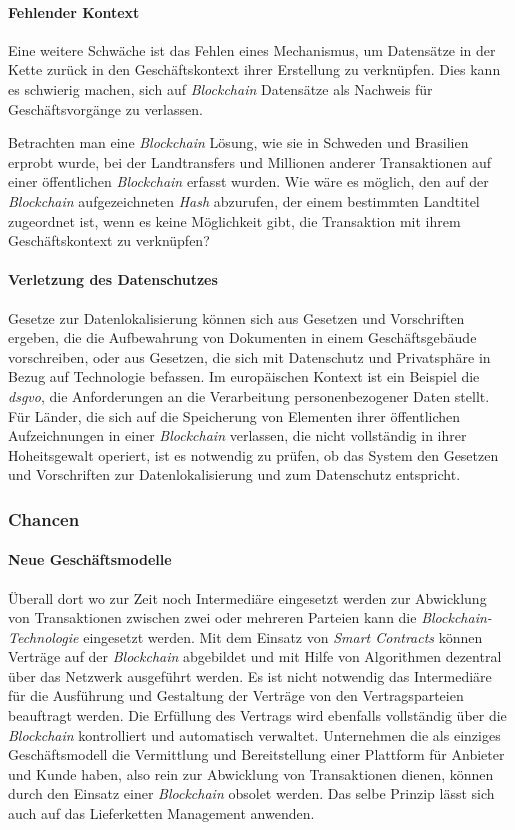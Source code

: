 \paragraph{Fehlender Kontext}
Eine weitere Schwäche ist das Fehlen eines Mechanismus, um Datensätze in der Kette zurück in den Geschäftskontext ihrer Erstellung zu verknüpfen. Dies kann es schwierig machen, sich auf \textit{Blockchain} Datensätze als Nachweis für Geschäftsvorgänge zu verlassen.

Betrachten man eine \textit{Blockchain} Lösung, wie sie in Schweden und Brasilien erprobt wurde, bei der Landtransfers und Millionen anderer Transaktionen auf einer öffentlichen \textit{Blockchain} erfasst wurden. Wie wäre es möglich, den auf der \textit{Blockchain} aufgezeichneten \textit{Hash} abzurufen, der einem bestimmten Landtitel zugeordnet ist, wenn es keine Möglichkeit gibt, die Transaktion mit ihrem Geschäftskontext zu verknüpfen?

\paragraph{Verletzung des Datenschutzes}
Gesetze zur Datenlokalisierung können sich aus Gesetzen und Vorschriften ergeben, die die Aufbewahrung von Dokumenten in einem Geschäftsgebäude vorschreiben, oder aus Gesetzen, die sich mit Datenschutz und Privatsphäre in Bezug auf Technologie befassen. Im europäischen Kontext ist ein Beispiel die \textit{\ac{dsgvo}}, die Anforderungen an die Verarbeitung personenbezogener Daten stellt. Für Länder, die sich auf die Speicherung von Elementen ihrer öffentlichen Aufzeichnungen in einer \textit{Blockchain} verlassen, die nicht vollständig in ihrer Hoheitsgewalt operiert, ist es notwendig zu prüfen, ob das System den Gesetzen und Vorschriften zur Datenlokalisierung und zum Datenschutz entspricht.

\subsubsection{Chancen}
\paragraph{Neue Geschäftsmodelle}
Überall dort wo zur Zeit noch Intermediäre eingesetzt werden zur Abwicklung von Transaktionen zwischen zwei oder mehreren Parteien kann die \textit{Blockchain-Technologie} eingesetzt werden. Mit dem Einsatz von \textit{Smart Contracts} können Verträge auf der \textit{Blockchain} abgebildet und mit Hilfe von Algorithmen dezentral über das Netzwerk ausgeführt werden. Es ist nicht notwendig das Intermediäre für die Ausführung und Gestaltung der Verträge von den Vertragsparteien beauftragt werden. Die Erfüllung des Vertrags wird ebenfalls vollständig über die \textit{Blockchain} kontrolliert und automatisch verwaltet. Unternehmen die als einziges Geschäftsmodell die Vermittlung und Bereitstellung einer Plattform für Anbieter und Kunde haben, also rein zur Abwicklung von Transaktionen dienen, können durch den Einsatz einer \textit{Blockchain} obsolet werden. Das selbe Prinzip lässt sich auch auf das Lieferketten Management anwenden. 

